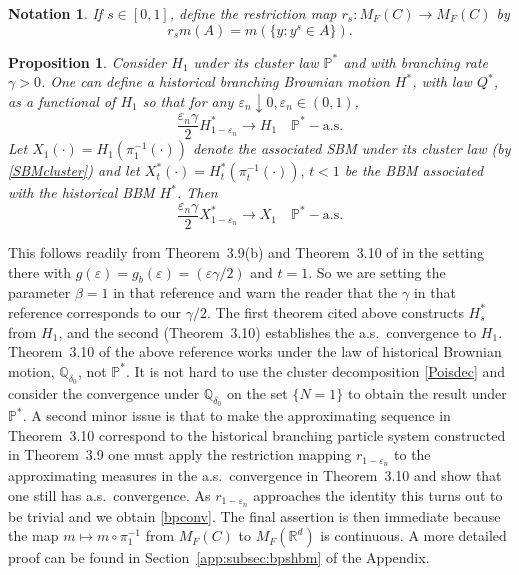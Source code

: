 \documentclass[12pt]{article}
\makeatletter
\renewenvironment{proof}[1][\proofname]{%
\par\pushQED{\qed}\normalfont%
\topsep6\p@\@plus6\p@\relax
\trivlist\item[\hskip\labelsep\bfseries#1\@addpunct{.}]%
\ignorespaces
}{%
\popQED\endtrivlist\@endpefalse
}
\newtheorem{proposition}[theorem]{Proposition}
\numberwithin{theorem}{section}
\theoremstyle{def}
\newtheorem*{notation}{Notation}
\numberwithin{equation}{section}
\renewcommand{\P}{\mathbb{P}}
\newcommand{\R}{\mathbb{R}}
\newcommand{\Q}{\mathbb{Q}}
\newcommand{\veps}{\varepsilon}
\newcommand{\ARXIV}[1]{#1}
\makeatother
\begin{document}
\begin{notation}  If $s\in [0,1]$, define the restriction map $r_s:M_F(C)\to M_F(C)$ by 
\[r_sm(A)=m(\{y:y^s\in A\}).\]
\end{notation}
\begin{proposition}\label{bpshbm}
Consider $H_1$ under its cluster law $\P^*$ and with branching rate $\gamma>0$. One can define a historical branching Brownian motion $H^*$, with law $Q^*$, as a functional of $H_1$ so that for any $\veps_n\downarrow 0, \veps_n\in(0,1)$, 
\begin{equation}\label{bpconv}
\frac{\veps_n\gamma}{2}H^*_{1-\veps_n}\to H_1 \quad  \P^*-\text{a.s.}
\end{equation}
Let $X_1(\cdot)=H_1(\pi_1^{-1}(\cdot))$ denote the associated SBM under its cluster law (by \eqref{SBMcluster}) and let $X^*_t(\cdot)=H^*_t(\pi_t^{-1}(\cdot)),\,t<1$ be the BBM associated with the historical BBM $H^*$. Then
\begin{equation*}
\frac{\veps_n\gamma}{2}X^*_{1-\veps_n}\to X_1 \quad \P^*-\text{a.s.}
\end{equation*}
\end{proposition}
\begin{proof} This follows readily from Theorem~3.9(b) and Theorem~3.10 of \cite{DP91} in the setting there with $g(\veps)=g_b(\veps)= (\veps \gamma/2)$ and $t=1$. So we are setting the parameter $\beta=1$ in that reference and warn the reader that the $\gamma$ in that reference corresponds to our $\gamma/2$.   
The first theorem cited above constructs $H^*_s$ from $H_1$, and the second (Theorem~3.10) establishes the a.s.\ convergence to $H_1$.  
Theorem~3.10 of the above reference works under the law of historical Brownian motion, $\Q_{\delta_0}$, not $\P^*$.  
It is not hard
to use the cluster decomposition \eqref{Poisdec} and consider the convergence under $\Q_{\delta_0}$ on the set $\{N=1\}$ to obtain the result under $\P^*$.  
A second minor issue is that to make the approximating sequence in Theorem~3.10 correspond to the historical branching particle system constructed in Theorem~3.9 one must apply the restriction mapping $r_{1-\veps_n}$ to the approximating measures in the a.s.\ convergence in Theorem~3.10 and show that one still has a.s.\ convergence. 
As $r_{1-\veps_n}$ approaches the identity this turns out to be trivial and we obtain \eqref{bpconv}.  
The final assertion is then immediate because the map $m\mapsto m\circ\pi_1^{-1}$ from $M_F(C)$ to $M_F(\R^d)$ is continuous.
\ARXIV{A more detailed proof can be found in Section~\ref{app:subsec:bpshbm} of the Appendix.}
\end{proof}
\end{document}
